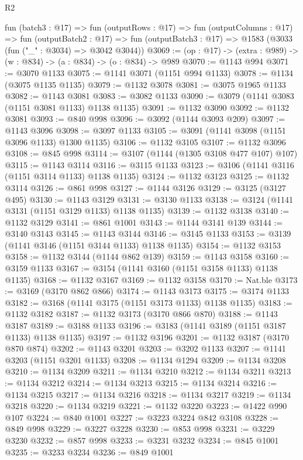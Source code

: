 \begin{lexlean}{R2}
\begin{coremodule}
  fun (batch3 : @17) =>
  fun (outputRows : @17) =>
  fun (outputColumns : @17) =>
  fun (outputBatch2 : @17) =>
  fun (outputBatch3 : @17) => @1583 (@3033 (fun ("_" : @3034) => @3042 @3044))
@3069 := (op : @17) -> (extra : @989) -> (w : @834) -> (a : @834) -> (o : @834) -> @989
@3070 := @1143 @994
@3071 := @3070 @1133
@3075 := @1141 @3071 (@1151 @994 @1133)
@3078 := @1134 (@3075 @1135 @1135)
@3079 := @1132 @3078
@3081 := @3075 @1965 @1133
@3082 := @1143 @3081
@3083 := @3082 @1133
@3090 := @3079 (@1141 @3083 (@1151 @3081 @1133) @1138 @1135)
@3091 := @1132 @3090
@3092 := @1132 @3081
@3093 := @840 @998
@3096 := @3092 (@1144 @3093 @209)
@3097 := @1143 @3096
@3098 := @3097 @1133
@3105 := @3091 (@1141 @3098 (@1151 @3096 @1133) @1300 @1135)
@3106 := @1132 @3105
@3107 := @1132 @3096
@3108 := @845 @998
@3114 := @3107 (@1144 (@1305 @3108 @477 @107) @107)
@3115 := @1143 @3114
@3116 := @3115 @1133
@3123 := @3106 (@1141 @3116 (@1151 @3114 @1133) @1138 @1135)
@3124 := @1132 @3123
@3125 := @1132 @3114
@3126 := @861 @998
@3127 := @1144 @3126
@3129 := @3125 (@3127 @495)
@3130 := @1143 @3129
@3131 := @3130 @1133
@3138 := @3124 (@1141 @3131 (@1151 @3129 @1133) @1138 @1135)
@3139 := @1132 @3138
@3140 := @1132 @3129
@3141 := @861 @1001
@3143 := @1144 @3141 @139
@3144 := @3140 @3143
@3145 := @1143 @3144
@3146 := @3145 @1133
@3153 := @3139 (@1141 @3146 (@1151 @3144 @1133) @1138 @1135)
@3154 := @1132 @3153
@3158 := @1132 @3144 (@1144 @862 @139)
@3159 := @1143 @3158
@3160 := @3159 @1133
@3167 := @3154 (@1141 @3160 (@1151 @3158 @1133) @1138 @1135)
@3168 := @1132 @3167
@3169 := @1132 @3158
@3170 := Nat.ble
@3173 := @3169 (@3170 @862 @866)
@3174 := @1143 @3173
@3175 := @3174 @1133
@3182 := @3168 (@1141 @3175 (@1151 @3173 @1133) @1138 @1135)
@3183 := @1132 @3182
@3187 := @1132 @3173 (@3170 @866 @870)
@3188 := @1143 @3187
@3189 := @3188 @1133
@3196 := @3183 (@1141 @3189 (@1151 @3187 @1133) @1138 @1135)
@3197 := @1132 @3196
@3201 := @1132 @3187 (@3170 @870 @874)
@3202 := @1143 @3201
@3203 := @3202 @1133
@3207 := @1141 @3203 (@1151 @3201 @1133)
@3208 := @1134 @1294
@3209 := @1134 @3208
@3210 := @1134 @3209
@3211 := @1134 @3210
@3212 := @1134 @3211
@3213 := @1134 @3212
@3214 := @1134 @3213
@3215 := @1134 @3214
@3216 := @1134 @3215
@3217 := @1134 @3216
@3218 := @1134 @3217
@3219 := @1134 @3218
@3220 := @1134 @3219
@3221 := @1132 @3220
@3223 := @1422 @990 @107
@3224 := @840 @1001
@3227 := @3223 @3224 @842 @3108
@3228 := @849 @998
@3229 := @3227 @3228
@3230 := @853 @998
@3231 := @3229 @3230
@3232 := @857 @998
@3233 := @3231 @3232
@3234 := @845 @1001
@3235 := @3233 @3234
@3236 := @849 @1001

\end{coremodule}
\end{lexlean}
